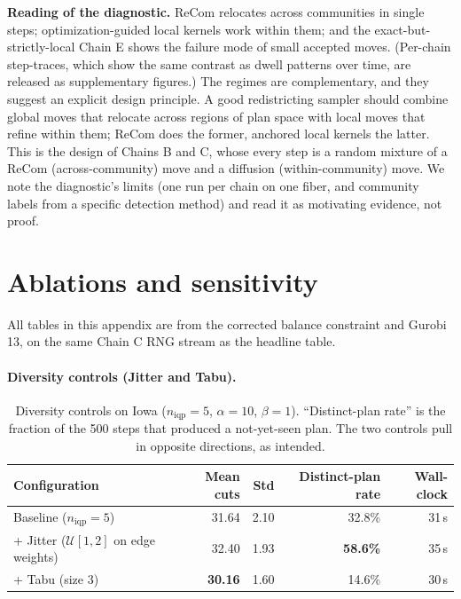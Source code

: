 \documentclass[11pt]{article}
\begin{document}
\textbf{Reading of the diagnostic.} ReCom relocates across
communities in single steps; optimization-guided local kernels work
within them; and the exact-but-strictly-local Chain E shows the
failure mode of small accepted moves. (Per-chain step-traces, which
show the same contrast as dwell patterns over time, are released as
supplementary figures.) The regimes are complementary, and they
suggest an explicit design principle. A good redistricting sampler
should combine global moves that relocate across regions of plan
space with local moves that refine within them; ReCom does the
former, anchored local kernels the latter. This is the design of
Chains B and C, whose every step is a random mixture of a ReCom
(across-community) move and a diffusion (within-community) move. We
note the diagnostic's limits (one run per chain on one fiber, and
community labels from a specific detection method) and read it as
motivating evidence, not proof.

\section{Ablations and sensitivity}\label{sec:exp-ablations}

All tables in this appendix are from the corrected balance
constraint and Gurobi 13, on the same Chain C RNG stream as the
headline table.

\paragraph{Diversity controls (Jitter and Tabu).}\label{sec:exp-diversity}

\begin{table}[H]
\centering
\small
\begin{tabular}{lrrrr}
\toprule
Configuration & Mean cuts & Std & Distinct-plan rate & Wall-clock \\
\midrule
Baseline ($n_{\mathrm{iqp}} = 5$)               & 31.64 & 2.10 & 32.8\% & 31\,s \\
+ Jitter ($\mathcal{U}[1,2]$ on edge weights)   & 32.40 & 1.93 & \textbf{58.6\%} & 35\,s \\
+ Tabu (size 3)                                  & \textbf{30.16} & 1.60 & 14.6\% & 30\,s \\
\bottomrule
\end{tabular}
\caption{Diversity controls on Iowa ($n_{\mathrm{iqp}} = 5$,
  $\alpha = 10$, $\beta = 1$). ``Distinct-plan rate'' is the fraction
  of the 500 steps that produced a not-yet-seen plan. The two
  controls pull in opposite directions, as intended.}\label{tab:diversity-iowa}
\end{table}
\end{document}
